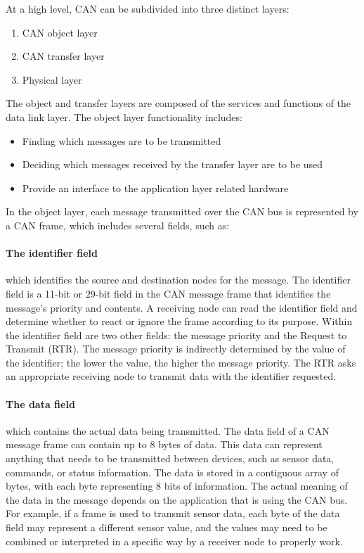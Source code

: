 At a high level, CAN can be subdivided into three distinct layers:

\begin{enumerate}
    \item CAN object layer
    \item CAN transfer layer
    \item Physical layer
\end{enumerate}

The object and transfer layers are composed of the services and functions of the data link layer. The object layer functionality includes:

\begin{itemize}
    \item Finding which messages are to be transmitted 
    \item Deciding which messages received by the transfer layer are to be used
    \item Provide an interface to the application layer related hardware
\end{itemize}

In the object layer, each message transmitted over the CAN bus is represented by a CAN frame, which includes several fields, such as:

\paragraph*{The identifier field} which identifies the source and destination nodes for the message. 
The identifier field is a 11-bit or 29-bit field  in the CAN message frame that identifies the message's priority and contents. 
A receiving node can read the identifier field and determine whether to react or ignore the frame according to its purpose. 
Within the identifier field are two other fields: the message priority and the Request to Transmit (RTR).
The message priority is indirectly determined by the value of the identifier; the lower the value, the higher the message priority.
The RTR asks an appropriate receiving node to transmit data with the identifier requested.

\paragraph*{The data field} which contains the actual data being transmitted. 
The data field of a CAN message frame can contain up to 8 bytes of data. 
This data can represent anything that needs to be transmitted between devices, such as sensor data, commands, or status information. 
The data is stored in a contiguous array of bytes, with each byte representing 8 bits of information.
The actual meaning of the data in the message depends on the application that is using the CAN bus. 
For example, if a frame is used to transmit sensor data, each byte of the data field may represent a different sensor value, and the values may need to be combined or interpreted in a specific way by a receiver node to properly work.

